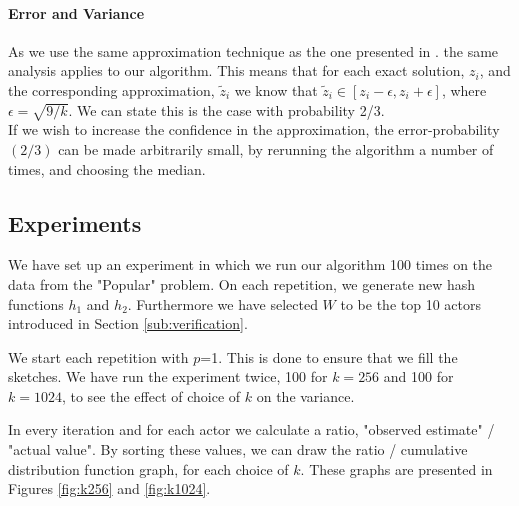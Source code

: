 \documentclass[a4paper,11pt]{article}
\begin{document}
\paragraph{Error and Variance}
As we use the same approximation technique as the one presented in \cite{paper:bar-yos}. the same analysis applies to our algorithm. This means that for each exact solution, $z_i$, and the corresponding approximation, $\tilde{z}_i$ we know that $\tilde{z}_i \in [z_i-\epsilon,z_i+\epsilon]$, where $\epsilon = \sqrt{9/k}$. We can state this is the case with probability 2/3.\\

If we wish to increase the confidence in the approximation, the error-probability $(2/3)$ can be made arbitrarily small, by rerunning the algorithm a number of times, and choosing the median.

\subsection{Experiments}
We have set up an experiment in which we run our algorithm 100 times on the data from the "Popular" problem.
On each repetition, we generate new hash functions $h_1$ and $h_2$.
Furthermore we have selected $W$ to be the top 10 actors introduced in Section \ref{sub:verification}. 

We start each repetition with $p$=1. This is done to ensure that we fill the sketches.
We have run the experiment twice, 100 for $k=256$ and 100 for $k=1024$, to see the effect of choice of $k$ on the variance.

In every iteration and for each actor we calculate a ratio, "observed estimate" / "actual value". By sorting these values, we can draw the ratio / cumulative distribution function graph, for each choice of $k$. These graphs are presented in Figures \ref{fig:k256} and \ref{fig:k1024}.
\end{document}
